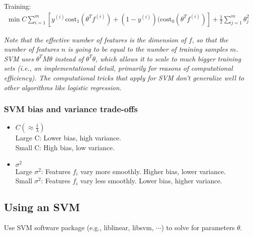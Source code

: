 Training:
\begin{align}
\min C \sum_{i=1}^m \left[ y^{(i)}\text{cost}_1(\theta^Tf^{(i)}) + (1-y^{(i)})(\text{cost}_0(\theta^Tf^{(i)}) \right] + \frac{1}{2}\sum_{j=1}^m\theta_j^2
\end{align}

\emph{\textcolor{Bittersweet}{Note that the effective number of features is the dimension of $f$, so that the number of features $n$ is going to be equal to the number of training samples $m$. SVM uses $\theta^{T}M\theta$ instead of $\theta^T\theta$, which allows it to scale to much bigger training sets (i.e., an implementational detail, primarily for reasons of computational efficiency). The computational tricks that apply for SVM don't generalize well to other algorithms like logistic regression.}}

\subsubsection{SVM bias and variance trade-offs}
\begin{itemize}
\item
$C (\approx \frac{1}{\lambda})$\\
Large C: Lower bias, high variance.\\
Small C: High bias, low variance.
\item
$\sigma^2$\\
Large $\sigma^2$: Features $f_i$ vary more smoothly. Higher bias, lower variance.\\
Small $\sigma^2$: Features $f_i$ vary less smoothly. Lower bias, higher variance.
\end{itemize}

%
\subsection{Using an SVM}
Use SVM software package (e.g., liblinear, libsvm, $\cdots$) to solve for parameters $\theta$.

